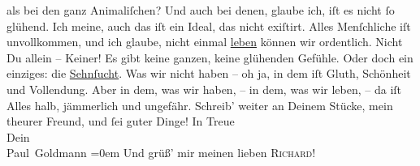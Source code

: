 \begin{ledgroupsized}[t]{13cm}
               als bei den ganz Animaliſchen? Und auch bei denen, glaube ich, iſt es nicht ſo
               glühend. Ich meine, auch das iſt ein Ideal, das nicht exiſtirt. Alles Menſchliche iſt
                   unvollkommen, und ich glaube, nicht einmal {\pb}\uline{leben} können wir ordentlich. Nicht Du allein –
               Keiner! Es gibt keine ganzen, keine glühenden Gefühle. Oder doch\strikeout{,} ein einziges: die \uline{Sehnſucht}. Was wir nicht haben – oh ja, in dem iſt Gluth, Schönheit und
               Vollendung. Aber in dem, was wir haben, – in dem, was wir leben, – da iſt Alles halb,
               jämmerlich und ungefähr.\pend
           \pstart
           {\pb}Schreib’ weiter an Deinem Stücke, mein theurer Freund,
               und ſei guter Dinge!\pend
           \pstart
           In Treue {\\[\baselineskip]}Dein {\\[\baselineskip]}\spacefill\mbox{Paul Goldmann}\pend
           \leftskip=0em{}\pstart
           \noindent{}Und grüß’ mir meinen lieben \textsc{Richard}!\pend
           
         
         \endnumbering{}\end{ledgroupsized}  \newcommand{\dateiname}{L02765}\newcommand{\titel}{Paul Goldmann an Arthur Schnitzler, 23. 1. [1896]}\newcommand{\editorInnen}{Martin Anton Müller und Laura Untner}
      